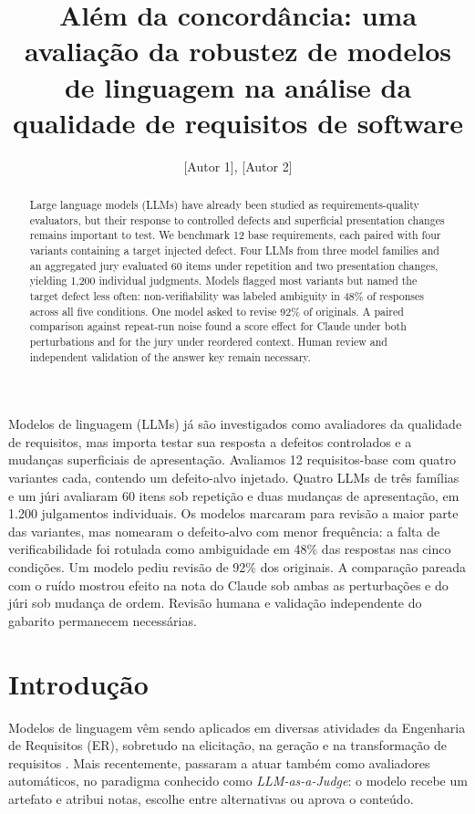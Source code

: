 \documentclass[12pt]{article}
\title{Além da concordância: uma avaliação da robustez de modelos de linguagem na análise da qualidade de requisitos de software}
\author{[Autor 1]\inst{1}, [Autor 2]\inst{1}}
\begin{document}
\maketitle

\begin{abstract}
Large language models (LLMs) have already been studied as requirements-quality evaluators, but their response to controlled defects and superficial presentation changes remains important to test. We benchmark 12 base requirements, each paired with four variants containing a target injected defect. Four LLMs from three model families and an aggregated jury evaluated 60 items under repetition and two presentation changes, yielding 1,200 individual judgments. Models flagged most variants but named the target defect less often: non-verifiability was labeled ambiguity in 48\% of responses across all five conditions. One model asked to revise 92\% of originals. A paired comparison against repeat-run noise found a score effect for Claude under both perturbations and for the jury under reordered context. Human review and independent validation of the answer key remain necessary.
\end{abstract}

\begin{resumo}
Modelos de linguagem (LLMs) já são investigados como avaliadores da qualidade de requisitos, mas importa testar sua resposta a defeitos controlados e a mudanças superficiais de apresentação. Avaliamos 12 requisitos-base com quatro variantes cada, contendo um defeito-alvo injetado. Quatro LLMs de três famílias e um júri avaliaram 60 itens sob repetição e duas mudanças de apresentação, em 1.200 julgamentos individuais. Os modelos marcaram para revisão a maior parte das variantes, mas nomearam o defeito-alvo com menor frequência: a falta de verificabilidade foi rotulada como ambiguidade em 48\% das respostas nas cinco condições. Um modelo pediu revisão de 92\% dos originais. A comparação pareada com o ruído mostrou efeito na nota do Claude sob ambas as perturbações e do júri sob mudança de ordem. Revisão humana e validação independente do gabarito permanecem necessárias.
\end{resumo}

\section{Introdução}

Modelos de linguagem vêm sendo aplicados em diversas atividades da Engenharia de Requisitos (ER), sobretudo na elicitação, na geração e na transformação de requisitos \citep{marques2024,silva2025}. Mais recentemente, passaram a atuar também como avaliadores automáticos, no paradigma conhecido como \emph{LLM-as-a-Judge}: o modelo recebe um artefato e atribui notas, escolhe entre alternativas ou aprova o conteúdo.
\end{document}

